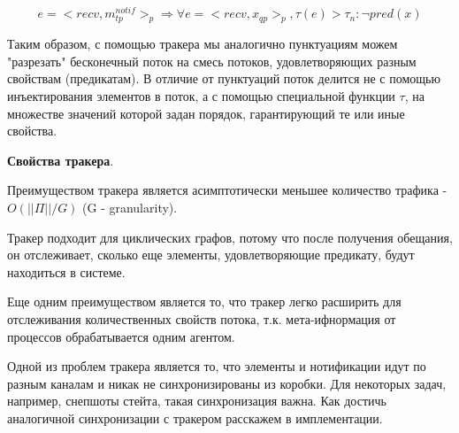 \documentclass[12pt]{article}
\begin{document}
$$e = <recv,m^{notif}_{tp}>_p \Rightarrow \forall e = <recv,x_{qp}>_p, \tau(e) > \tau_n : \neg pred(x)$$

Таким образом, с помощью тракера мы аналогично пунктуациям можем "разрезать" бесконечный поток на смесь потоков, удовлетворяющих разным свойствам (предикатам). В отличие от пунктуаций поток делится не с помощью инъектирования элементов в поток, а с помощью специальной функции $\tau$, на множестве значений которой задан порядок, гарантирующий те или иные свойства.

\textbf{Свойства тракера}.

Преимуществом тракера является асимптотически меньшее количество трафика - $O(||\Pi|| / G)$ (G - granularity).

Тракер подходит для циклических графов, потому что после получения обещания, он отслеживает, сколько еще элементы, удовлетворяющие предикату, будут находиться в системе.

Еще одним преимуществом является то, что тракер легко расширить для отслеживания количественных свойств потока, т.к. мета-ифнормация от процессов обрабатывается одним агентом.

Одной из проблем тракера является то, что элементы и нотификации идут по разным каналам и никак не синхронизированы из коробки. Для некоторых задач, например, снепшоты стейта, такая синхронизация важна. Как достичь аналогичной синхронизации с тракером расскажем в имплементации.
\end{document}
